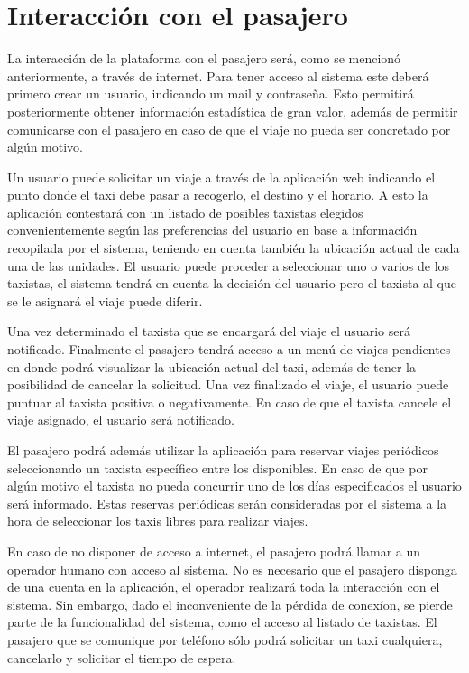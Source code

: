 \section{Interacción con el pasajero}
La interacción de la plataforma con el pasajero será, como se mencionó anteriormente, a través de internet. Para tener acceso al sistema este deberá primero crear un usuario, indicando un mail y contraseña. Esto permitirá posteriormente obtener información estadística de gran valor, además de permitir comunicarse con el pasajero en caso de que el viaje no pueda ser concretado por algún motivo. 

Un usuario puede solicitar un viaje a través de la aplicación web indicando el punto donde el taxi debe pasar a recogerlo, el destino y el horario. A esto la aplicación contestará con un listado de posibles taxistas elegidos convenientemente según las preferencias del usuario en base a información recopilada por el sistema, teniendo en cuenta también la ubicación actual de cada una de las unidades. El usuario puede proceder a seleccionar uno o varios de los taxistas, el sistema tendrá en cuenta la decisión del usuario pero el taxista al que se le asignará el viaje puede diferir.

Una vez determinado el taxista que se encargará del viaje el usuario será notificado. Finalmente el pasajero tendrá acceso a un menú de viajes pendientes en donde podrá visualizar la ubicación actual del taxi, además de tener la posibilidad de cancelar la solicitud. Una vez finalizado el viaje, el usuario puede puntuar al taxista positiva o negativamente. En caso de que el taxista cancele el viaje asignado, el usuario será notificado.

El pasajero podrá además utilizar la aplicación para reservar viajes periódicos seleccionando un taxista específico entre los disponibles. En caso de que por algún motivo el taxista no pueda concurrir uno de los días especificados el usuario será informado. Estas reservas periódicas serán consideradas por el sistema a la hora de seleccionar los taxis libres para realizar viajes.

En caso de no disponer de acceso a internet, el pasajero podrá llamar a un operador humano con acceso al sistema. No es necesario que el pasajero disponga de una cuenta en la aplicación, el operador realizará toda la interacción con el sistema. Sin embargo, dado el inconveniente de la p\'erdida de conex\'ion, se pierde parte de la funcionalidad del sistema, como el acceso al listado de taxistas. El pasajero que se comunique por tel\'efono s\'olo podr\'a solicitar un taxi cualquiera, cancelarlo y solicitar el tiempo de espera.

